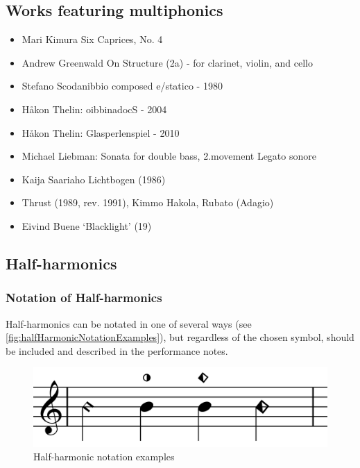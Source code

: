 \subsection{Works featuring multiphonics} \label{sec:multiphonicsLiterature}

\begin{itemize}
    \item Mari Kimura Six Caprices, No. 4 
    \item Andrew Greenwald On Structure (2a) - for clarinet, violin, and cello
    \item Stefano Scodanibbio composed e/statico - 1980
    \item Håkon Thelin: oibbinadocS - 2004
    \item Håkon Thelin: Glasperlenspiel - 2010
    \item Michael Liebman: Sonata for double bass, 2.movement Legato sonore
    \item Kaija Saariaho Lichtbogen (1986)
    \item Thrust (1989, rev. 1991),  Kimmo Hakola, Rubato (Adagio) 
    \item Eivind Buene `Blacklight' (19)
\end{itemize}

\subsection{Half-harmonics} \label{sec:half-harmonics}

\subsubsection{Notation of Half-harmonics} \label{sec:notation-half-harmonics}
Half-harmonics can be notated in one of several ways (see \autoref{fig:halfHarmonicNotationExamples}), but regardless of the chosen symbol, should be included and described in the performance notes.


\begin{figure}
    \includegraphics[width=\linewidth]{./resources/halfHarmonicNotationExamples.pdf}
    \caption{Half-harmonic notation examples} \label{fig:halfHarmonicNotationExamples}
  \end{figure}

